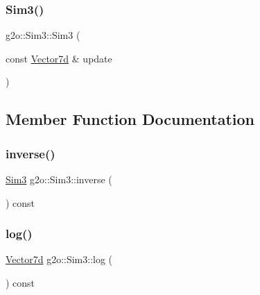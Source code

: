 \mbox{\label{structg2o_1_1_sim3_a252f62d72e8449ecc929a6ca0320fcbc}} 
\subsubsection{\texorpdfstring{Sim3()}{Sim3()}\hspace{0.1cm}{\footnotesize\ttfamily [4/4]}}
{\footnotesize\ttfamily g2o\+::\+Sim3\+::\+Sim3 (\begin{DoxyParamCaption}\item[{const \mbox{\hyperlink{namespaceg2o_a4740ec41130f2ecc628c81f71261c8de}{Vector7d}} \&}]{update }\end{DoxyParamCaption})\hspace{0.3cm}{\ttfamily [inline]}}



\subsection{Member Function Documentation}
\mbox{\label{structg2o_1_1_sim3_aad881b9ea79640adac90d8ae58b4a5f0}} 
\subsubsection{\texorpdfstring{inverse()}{inverse()}}
{\footnotesize\ttfamily \mbox{\hyperlink{structg2o_1_1_sim3}{Sim3}} g2o\+::\+Sim3\+::inverse (\begin{DoxyParamCaption}{ }\end{DoxyParamCaption}) const\hspace{0.3cm}{\ttfamily [inline]}}

\mbox{\label{structg2o_1_1_sim3_a63fedc1606012b8ce197554f6489080b}} 
\subsubsection{\texorpdfstring{log()}{log()}}
{\footnotesize\ttfamily \mbox{\hyperlink{namespaceg2o_a4740ec41130f2ecc628c81f71261c8de}{Vector7d}} g2o\+::\+Sim3\+::log (\begin{DoxyParamCaption}{ }\end{DoxyParamCaption}) const\hspace{0.3cm}{\ttfamily [inline]}}

